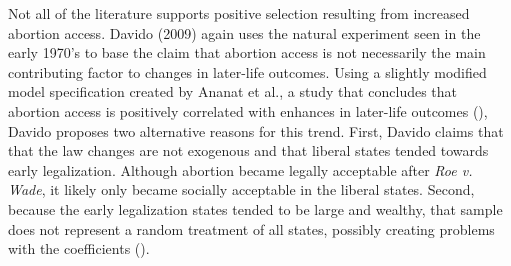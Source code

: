         Not all of the literature supports positive selection resulting from increased abortion access. Davido (2009) again uses the natural experiment seen in the early 1970's to base the claim that abortion access is not necessarily the main contributing factor to changes in later-life outcomes. Using a slightly modified model specification created by Ananat et al., a study that concludes that abortion access is positively correlated with enhances in later-life outcomes (\cite{ananat}), Davido proposes two alternative reasons for this trend. First, Davido claims that that the law changes are not exogenous and that liberal states tended towards early legalization. Although abortion became legally acceptable after \textit{Roe v. Wade}, it likely only became socially acceptable in the liberal states. Second, because the early legalization states tended to be large and wealthy, that sample does not represent a random treatment of all states, possibly creating problems with the coefficients (\cite{davido}).
